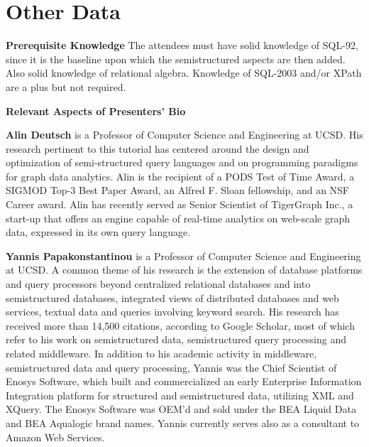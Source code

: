 

\section{Other Data}
\label{sec:duration}

\noindent \textbf{Prerequisite Knowledge} 
\label{sec:audience}
The attendees must have solid knowledge of SQL-92, since it is the baseline upon which the semistructured aspects are then added. Also solid knowledge of relational algebra. Knowledge of SQL-2003 and/or XPath are a plus but not required.

\noindent \textbf{Relevant Aspects of Presenters' Bio} 

\noindent \textbf{Alin Deutsch} is a Professor of Computer Science and Engineering at UCSD. His research pertinent to this tutorial has centered around the design and optimization of semi-structured query languages
and on programming paradigms for graph data analytics. Alin is the recipient of a PODS Test of Time Award, a SIGMOD Top-3 Best Paper Award, an Alfred F. Sloan fellowship, and an NSF Career award.
Alin has recently served as Senior Scientist of TigerGraph Inc., a start-up that offers an engine capable of real-time analytics on web-scale graph data, expressed in its own query language.

\noindent \textbf{Yannis Papakonstantinou} is a Professor of Computer Science and Engineering at UCSD. A common theme of his research is the extension of database platforms and query processors beyond centralized relational databases and into semistructured databases, integrated views of distributed databases and web services, textual data and queries involving keyword search. His research has received more than 14,500 citations, according to Google Scholar, most of which refer to his work on semistructured data, semistructured query processing and related middleware.
In addition to his academic activity in middleware, semistructured data and query processing, Yannis was the Chief Scientist of Enosys Software, which built and commercialized an early Enterprise Information Integration platform for structured and semistructured data, utilizing XML and XQuery. The Enosys Software was OEM'd and sold under the BEA Liquid Data and BEA Aqualogic brand names. Yannis currently serves also as a consultant to Amazon Web Services.

